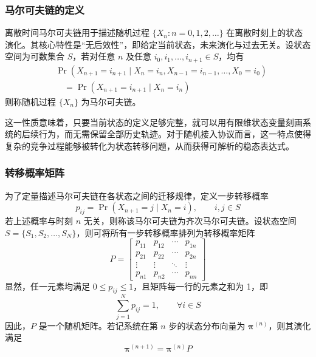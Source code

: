 \subsubsection{马尔可夫链的定义}
离散时间马尔可夫链用于描述随机过程 $\{X_n : n=0,1,2,\dots\}$ 在离散时刻上的状态演化。其核心特性是“无后效性”，即给定当前状态，未来演化与过去无关。设状态空间为可数集合 $S$，若对任意 $n$ 及任意 $i_0,i_1,\dots,i_{n+1}\in S$，均有
\begin{equation}
    \begin{split}
        &\Pr(X_{n+1}=i_{n+1} \mid X_n=i_n, X_{n-1}=i_{n-1}, \dots, X_0=i_0) \\
        &\quad = \Pr(X_{n+1}=i_{n+1} \mid X_n=i_n)
    \end{split}
\end{equation}
则称随机过程 $\{X_n\}$ 为马尔可夫链。

这一性质意味着，只要当前状态的定义足够完整，就可以用有限维状态变量刻画系统的后续行为，而无需保留全部历史轨迹。对于随机接入协议而言，这一特点使得复杂的竞争过程能够被转化为状态转移问题，从而获得可解析的稳态表达式。

\subsubsection{转移概率矩阵}
为了定量描述马尔可夫链在各状态之间的迁移规律，定义一步转移概率
\begin{equation}
    p_{ij}=\Pr(X_{n+1}=j \mid X_n=i), \qquad i,j \in S
\end{equation}
若上述概率与时刻 $n$ 无关，则称该马尔可夫链为齐次马尔可夫链。设状态空间 $S=\{S_1,S_2,\dots,S_N\}$，则可将所有一步转移概率排列为转移概率矩阵
\begin{equation}
    P = \begin{bmatrix}
        p_{11} & p_{12} & \cdots & p_{1n} \\
        p_{21} & p_{22} & \cdots & p_{2n} \\
        \vdots & \vdots & \ddots & \vdots \\
        p_{n1} & p_{n2} & \cdots & p_{nn}
    \end{bmatrix}
\end{equation}
显然，任一元素均满足 $0 \le p_{ij} \le 1$，且矩阵每一行的元素之和为 1，即
\begin{equation}
    \sum_{j=1}^{N}p_{ij}=1,\qquad \forall i \in S
\end{equation}
因此，$P$ 是一个随机矩阵。若记系统在第 $n$ 步的状态分布向量为 $\boldsymbol{\pi}^{(n)}$，则其演化满足
\begin{equation}
    \boldsymbol{\pi}^{(n+1)}=\boldsymbol{\pi}^{(n)}P
\end{equation}

